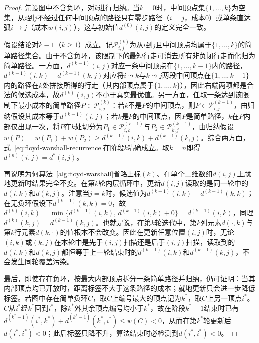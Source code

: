 \begin{proof}
先设图中不含负环，对$k$进行归纳。当$k=0$时，中间顶点集$\{1,\ldots,k\}$为空集，从$i$到$j$不经过任何中间顶点的路径只有零步路径（$i=j$，成本$0$）或单条直达弧$i\to j$（成本$w(i,j)$），这与初始值$d^{(0)}(i,j)$的定义完全一致。

假设结论对$k-1$（$k\geq1$）成立。记$\mathcal P^{(k)}_{i,j}$为从$i$到$j$且中间顶点均属于$\{1,\ldots,k\}$的简单路径集合。由于不含负环，该限制下的最短行走可消去所有非负闭行走而化归为简单路径。一方面，$d^{(k-1)}(i,j)$对应一条中间顶点在$\{1,\ldots,k-1\}$内的路径，$d^{(k-1)}(i,k)+d^{(k-1)}(k,j)$对应将$i\leadsto k$与$k\leadsto j$两段中间顶点在$\{1,\ldots,k-1\}$内的路径在$k$处拼接所得的行走（其内部顶点属于$\{1,\ldots,k\}$），因此右端两项都是合法的候选成本，故$d^{(k)}(i,j)$不小于真实最优值。另一方面，任取一条达到该限制下最小成本的简单路径$P\in\mathcal P^{(k)}_{i,j}$：若$k$不是$P$的中间顶点，则$P\in\mathcal P^{(k-1)}_{i,j}$，由归纳假设其成本等于$d^{(k-1)}(i,j)$；若$k$是$P$的中间顶点，因$P$是简单路径，$k$在$P$内部仅出现一次，将$P$在$k$处切分为$P_1\in\mathcal P^{(k-1)}_{i,k}$与$P_2\in\mathcal P^{(k-1)}_{k,j}$，由归纳假设$w(P)=w(P_1)+w(P_2)\geq d^{(k-1)}(i,k)+d^{(k-1)}(k,j)$。综合两方面，式~\eqref{eq:floyd-warshall-recurrence}在阶段$k$精确成立。取$k=n$即得$d^{(n)}(i,j)=d^*(i,j)$。

再说明为何算法~\ref{alg:floyd-warshall}省略上标$(k)$、在单个二维数组$d(i,j)$上就地更新时结果完全不变。在第$k$轮内层循环中，更新$d(i,j)$读取的是同一轮中的$d(i,k)$和$d(k,j)$。注意当$j=k$时，候选值为$d^{(k-1)}(i,k)+d^{(k-1)}(k,k)$；在无负环假设下$d^{(k-1)}(k,k)=0$，故$d^{(k)}(i,k)=\min\{d^{(k-1)}(i,k),\,d^{(k-1)}(i,k)+0\}=d^{(k-1)}(i,k)$，同理$d^{(k)}(k,j)=d^{(k-1)}(k,j)$。也就是说，在第$k$轮迭代中，第$k$列元素$d(\cdot,k)$与第$k$行元素$d(k,\cdot)$的值根本不会改变。因此在更新任意位置$(i,j)$时，无论$(i,k)$或$(k,j)$在本轮中是先于$(i,j)$扫描还是后于$(i,j)$扫描，读取到的$d(i,k)$和$d(k,j)$都恒等于上一轮结束时的$d^{(k-1)}(i,k)$和$d^{(k-1)}(k,j)$，不会发生同轮覆盖污染。

最后，即使存在负环，按最大内部顶点拆分一条简单路径并归纳，仍可证明：当其内部顶点均已开放时，距离标签不大于这条路径的成本；就地更新只会进一步降低标签。若图中存在简单负环$C$，取$C$上编号最大的顶点记为$k^*$，取$C$上另一顶点$i^*$。$C$从$i^*$经$k^*$回到$i^*$，除$k^*$外其余顶点编号均小于$k^*$，故在阶段$k^*-1$结束时已有$d^{(k^*-1)}(i^*,k^*)+d^{(k^*-1)}(k^*,i^*)\leq w(C)<0$，从而在第$k^*$轮更新后$d(i^*,i^*)<0$；此后标签只降不升，算法结束时必检测到$d(i^*,i^*)<0$。
\end{proof}

